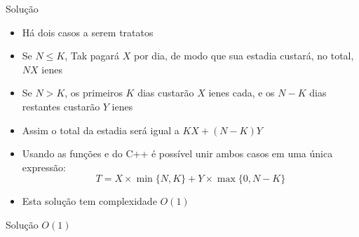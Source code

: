 \begin{frame}[fragile]{Solução}

    \begin{itemize}
        \item Há dois casos a serem tratatos
            
        \item Se $N\leq K$, Tak pagará $X$ por dia, de modo que sua estadia custará, no total,
            $NX$ ienes

        \item Se $N > K$, os primeiros $K$ dias custarão $X$ ienes cada, e os $N - K$ dias
            restantes custarão $Y$ ienes

        \item Assim o total da estadia será igual a $KX + (N - K)Y$

        \item Usando as funções  e  do C++ é possível unir 
            ambos casos em uma única expressão:
        \[
            T = X\times \min\{ N, K \} + Y\times \max\{ 0, N - K \}
        \]

        \item Esta solução tem complexidade $O(1)$
    \end{itemize}

\end{frame}

\begin{frame}[fragile]{Solução $O(1)$}
\end{frame}
